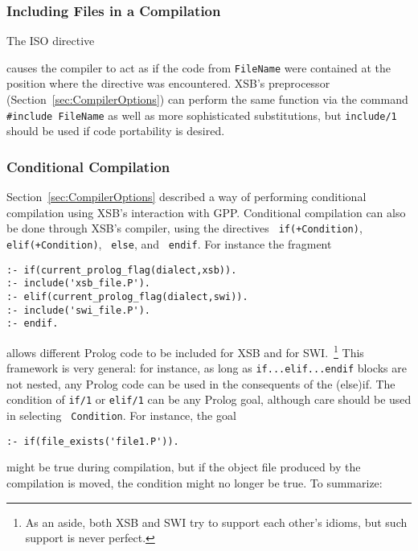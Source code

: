 \subsubsection{Including Files in a Compilation}

\begin{description}


The ISO directive 


\noindent
causes the compiler to act as if the code from {\tt FileName} were
contained at the position where the directive was encountered.  XSB's
preprocessor (Section~\ref{sec:CompilerOptions}) can perform the same
function via the command \verb|#include FileName| as well as more
sophisticated substitutions, but {\tt include/1} should be used if
code portability is desired.

\end{description}

\subsubsection{Conditional Compilation}
%
Section~\ref{sec:CompilerOptions} described a way of performing
conditional compilation using XSB's interaction with GPP.  Conditional
compilation can also be done through XSB's compiler, using the
directives {\tt \mif{} if(+Condition)}, {\tt \mif{} elif(+Condition)},
{\tt \mif{} else}, and {\tt \mif{} endif}.  For instance the fragment

\begin{verbatim}
:- if(current_prolog_flag(dialect,xsb)).
:- include('xsb_file.P').
:- elif(current_prolog_flag(dialect,swi)).
:- include('swi_file.P').
:- endif.
\end{verbatim}
\noindent
allows different Prolog code to be included for XSB and for
SWI.~\footnote{As an aside, both XSB and SWI try to support each
  other's idioms, but such support is never perfect.}  This framework
is very general: for instance, as long as {\tt if...elif...endif}
blocks are not nested, any Prolog code can be used in the consequents
of the (else)if.  The condition of {\tt if/1} or {\tt elif/1} can be
any Prolog goal, although care should be used in selecting {\tt
  Condition}.  For instance, the goal

\begin{verbatim}
:- if(file_exists('file1.P')).
\end{verbatim}
\noindent
might be true during compilation, but if the object file produced by
the compilation is moved, the condition might no longer be true.  To
summarize:

